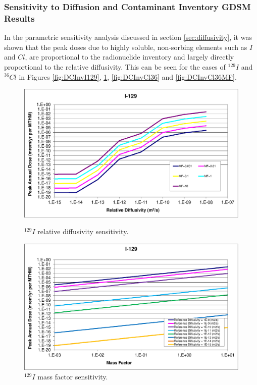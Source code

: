 
\subsubsection{Sensitivity to Diffusion and Contaminant Inventory GDSM Results}

In the parametric sensitivity analysis discussed in section
\ref{sec:diffusivity}, it was shown that
the peak doses due to highly soluble, non-sorbing elements such as $I$ and $Cl$, 
are  proportional to the radionuclide inventory and 
largely directly proportional to the relative diffusivity. This can be seen for 
the cases of $^{129}I$ and $^{36}Cl$ in Figures \ref{fig:DCInvI129}, 
\ref{fig:DCInvI129MF}, \ref{fig:DCInvCl36} and \ref{fig:DCInvCl36MF}.

\begin{figure}[ht]
\centering
\begin{minipage}[b]{0.45\linewidth}

\includegraphics[width=\linewidth]{./chapters/nuclide_sensitivity/clay/DiffCoeffAndInvEBSFail/I-129.eps}
\caption{$^{129}I$ relative diffusivity sensitivity.}
\label{fig:DCInvI129}

\end{minipage}
\hspace{0.05\linewidth}
\begin{minipage}[b]{0.45\linewidth}

\includegraphics[width=\linewidth]{./chapters/nuclide_sensitivity/clay/DiffCoeffAndInvEBSFail/I-129-MF.eps}
\caption{$^{129}I$ mass factor sensitivity.}
\label{fig:DCInvI129MF}

\end{minipage}
\end{figure}

